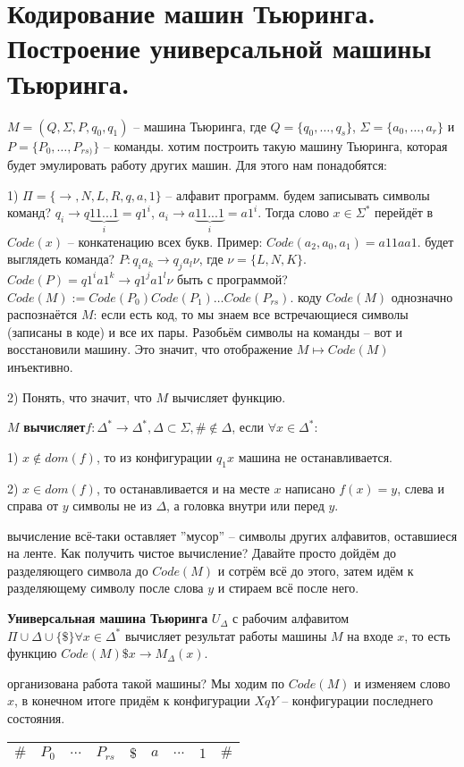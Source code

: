 \section{Кодирование машин Тьюринга. Построение универсальной машины Тьюринга.}
 $M=(Q, \Sigma, P, q_{0}, q_{1})$ -- машина Тьюринга, где $Q = \{q_{0}, \dots, q_{s}\}$, $\Sigma = \{a_{0}, \dots, a_{r}\}$ и $P = \{P_{0}, \dots,  P_{rs)}\}$ -- команды. 
 хотим построить такую машину Тьюринга, которая будет эмулировать работу других машин. Для этого нам понадобятся:
\par1) $\Pi = \{\rightarrow, N, L, R, q, a, 1\}$ -- алфавит программ.
 будем записывать символы команд? $q_{i} \rightarrow q\underbrace{11...1}_{i} = q1^i$, $a_{i} \rightarrow a\underbrace{11...1}_{i} = a1^i$. Тогда слово $x \in \Sigma^*$ перейдёт в $Code(x)$ -- конкатенацию всех букв. Пример: $Code(a_{2}, a_{0}, a_{1}) = a11aa1$.
 будет выглядеть команда? $ P: q_{i}a_{k} \rightarrow q_{j}a_{l}\nu$, где $\nu = \{L, N, K \}$. $Code(P) = q1^i a1^k \rightarrow q1^j a1^l \nu$
 быть с программой? $Code(M) := Code(P_{0})Code(P_{1}) \dots Code(P_{rs})$.
 коду $Code(M)$ однозначно распознаётся $M$: если есть код, то мы знаем все встречающиеся символы (записаны в коде) и все их пары. Разобьём символы на команды -- вот и восстановили машину. Это значит, что отображение $M \mapsto Code(M)$ инъективно.
\par2) Понять, что значит, что $M$ вычисляет функцию.
\par\begin{definition}$M$ \textbf{вычисляет}$f : \Delta^* \rightarrow \Delta^*, \Delta \subset \Sigma, \# \notin \Delta$, если $\forall x \in \Delta^*$:
\par1) $x \notin dom(f)$, то из конфигурации $q_{1}x$ машина не останавливается.
\par2) $x \in dom(f)$, то останавливается и на месте $x$ написано $f(x) = y$, слева и справа от $y$ символы не из $\Delta$, а головка внутри или перед $y$.
\end{definition}
 вычисление всё-таки оставляет ''мусор'' -- символы других алфавитов, оставшиеся на ленте. Как получить чистое вычисление? Давайте просто дойдём до разделяющего символа до $Code(M)$ и сотрём всё до этого, затем идём к разделяющему символу после слова $y$ и стираем всё после него.
\par\begin{definition}\textbf{Универсальная машина Тьюринга} $U_{\Delta}$ с рабочим алфавитом $\Pi\cup\Delta\cup\{\$\} \forall x \in \Delta^*$ вычисляет результат работы машины $M$ на входе $x$, то есть функцию $Code(M)\$x \rightarrow M_{\Delta}(x)$.
\end{definition}
 организована работа такой машины? Мы ходим по $Code(M)$ и изменяем слово $x$, в конечном итоге придём к конфигурации $XqY$ -- конфигурации последнего состояния. 
\par
\begin{tabular}{ c|c|c|c|c|c|c|c|c } 
 \hline
 $\#$ & $P_{0}$ & $...$  & $P_{rs}$ & $\$$ & $a$ & $...$ & $1$ & $\#$ \\  \hline
\end{tabular}